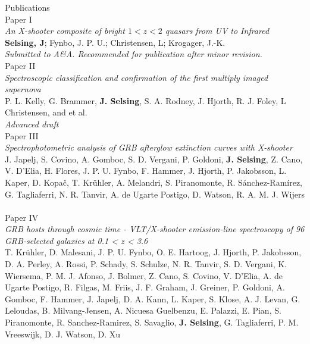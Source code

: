 \clearpage

{\Large Publications} \\
{\large Paper I} \\
\textit{An X-shooter composite of bright $1<z<2$ quasars from UV to Infrared} \\
\textbf{Selsing, J}; Fynbo, J. P. U.; Christensen, L;  Krogager, J.-K. \\
\textit{Submitted to A\&A. Recommended for publication after minor revision.} \\

{\large Paper II} \\
\textit{Spectroscopic classification and confirmation of the first multiply imaged supernova}\\
P. L. Kelly, G. Brammer, \textbf{J. Selsing}, S. A. Rodney, J. Hjorth, R. J. Foley, L Christensen, and et al. \\
\textit{Advanced draft} \\


{\large Paper III} \\
\textit{Spectrophotometric analysis of GRB afterglow extinction curves with X-shooter} \\
J. Japelj, S. Covino, A. Gomboc, S. D. Vergani, P. Goldoni,\textbf{ J. Selsing}, Z. Cano, V. D'Elia, H. Flores, J. P. U. Fynbo, F. Hammer, J. Hjorth, P. Jakobsson, L. Kaper, D. Kopač, T. Krühler, A. Melandri, S. Piranomonte, R. Sánchez-Ramírez, G. Tagliaferri, N. R. Tanvir, A. de Ugarte Postigo, D. Watson, R. A. M. J. Wijers \\
\citet{Japelj2015} \\


{\large Paper IV} \\
\textit{GRB hosts through cosmic time - VLT/X-shooter emission-line spectroscopy of 96 GRB-selected galaxies at 0.1 < z < 3.6} \\
T. Krühler, D. Malesani, J. P. U. Fynbo, O. E. Hartoog, J. Hjorth, P. Jakobsson, D. A. Perley, A. Rossi, P. Schady, S. Schulze, N. R. Tanvir, S. D. Vergani, K. Wiersema, P. M. J. Afonso, J. Bolmer, Z. Cano, S. Covino, V. D'Elia, A. de Ugarte Postigo, R. Filgas, M. Friis, J. F. Graham, J. Greiner, P. Goldoni, A. Gomboc, F. Hammer, J. Japelj, D. A. Kann, L. Kaper, S. Klose, A. J. Levan, G. Leloudas, B. Milvang-Jensen, A. Nicuesa Guelbenzu, E. Palazzi, E. Pian, S. Piranomonte, R. Sanchez-Ramirez, S. Savaglio, \textbf{J. Selsing}, G. Tagliaferri, P. M. Vreeswijk, D. J. Watson, D. Xu \\
\citet{Kruhler2015} \\

